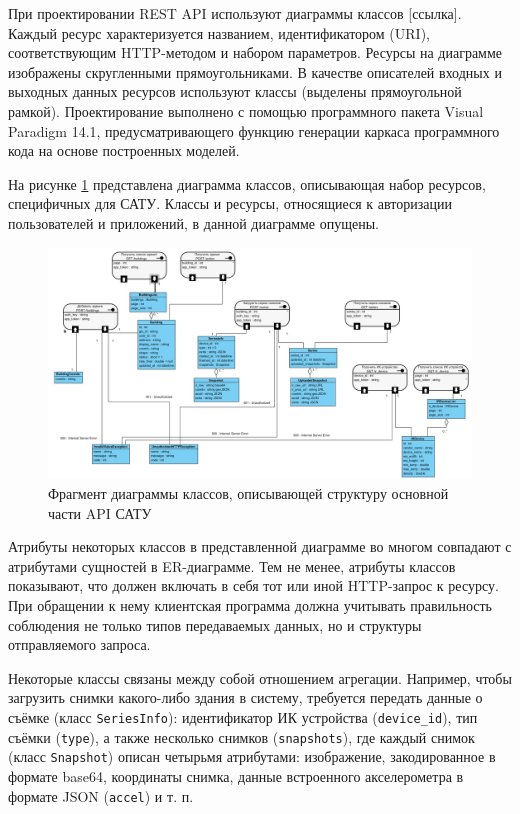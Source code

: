 	При проектировании REST API используют диаграммы классов [ссылка]. Каждый ресурс характеризуется названием, идентификатором (URI), соответствующим HTTP-методом и набором параметров. Ресурсы на диаграмме изображены скругленными прямоугольниками. В качестве описателей входных и выходных данных ресурсов используют классы (выделены прямоугольной рамкой). Проектирование выполнено с помощью программного пакета Visual Paradigm 14.1, предусматривающего функцию генерации каркаса программного кода на основе построенных моделей.

	На рисунке \ref{uml:1} представлена диаграмма классов, описывающая набор ресурсов, специфичных для САТУ. Классы и ресурсы, относящиеся к авторизации пользователей и приложений, в данной диаграмме опущены.

	\pagebreak

	\begin{landscape}

		\begin{figure}[t!]
		      \centering
		      \includegraphics[width=1.3\textwidth]{images/uml/1}
		      \caption{Фрагмент диаграммы классов, описывающей структуру основной части API САТУ}
		      \label{uml:1}
		\end{figure}

	\end{landscape}

	\pagebreak

	Атрибуты некоторых классов в представленной диаграмме во многом совпадают с атрибутами сущностей в ER-диаграмме. Тем не менее, атрибуты классов показывают, что должен включать в себя тот или иной HTTP-запрос к ресурсу. При обращении к нему клиентская программа должна учитывать правильность соблюдения не только типов передаваемых данных, но и структуры отправляемого запроса.

	Некоторые классы связаны между собой отношением агрегации. Например, чтобы загрузить снимки какого-либо здания в систему, требуется передать данные о съёмке (класс \texttt{SeriesInfo}): идентификатор ИК устройства (\texttt{device\_id}), тип съёмки (\texttt{type}), а также несколько снимков (\texttt{snapshots}), где каждый снимок (класс \texttt{Snapshot}) описан четырьмя атрибутами: изображение, закодированное в формате base64, координаты снимка, данные встроенного акселерометра в формате JSON (\texttt{accel}) и т. п.

